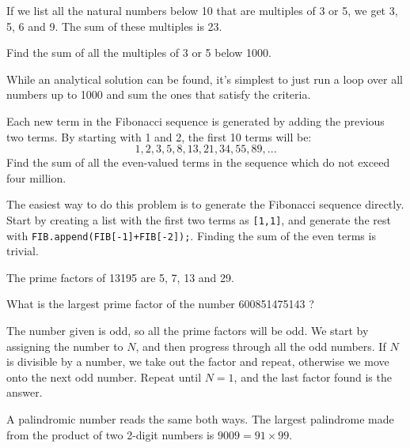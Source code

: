 
If we list all the natural numbers below 10 that are multiples of 3 or 5, we get 3, 5, 6 and 9. The sum of these multiples is 23.

Find the sum of all the multiples of 3 or 5 below 1000.


While an analytical solution can be found, it's simplest to just run a loop over all numbers up to 1000
and sum the ones that satisfy the criteria.





Each new term in the Fibonacci sequence is generated by adding the previous two terms. By starting with 1 and 2, the first 10 terms will be:
$$1, 2, 3, 5, 8, 13, 21, 34, 55, 89, ...$$
Find the sum of all the even-valued terms in the sequence which do not exceed four million.


The easiest way to do this problem is to generate the Fibonacci sequence directly.  Start by creating a list with the first
two terms as \verb"[1,1]",
and generate the rest with \verb"FIB.append(FIB[-1]+FIB[-2]);".  Finding the sum of the even terms is trivial.





The prime factors of 13195 are 5, 7, 13 and 29.

What is the largest prime factor of the number 600851475143 ?


The number given is odd, so all the prime factors will be odd.  We start by assigning the number to $N$,
and then progress through all the odd numbers.  If $N$ is divisible by a number, we take out the factor and
repeat, otherwise we move onto the next odd number.  Repeat until $N = 1$, and the last factor found is the answer.






A palindromic number reads the same both ways. The largest palindrome made from the product of two 2-digit numbers is $9009 = 91 \times 99$.

